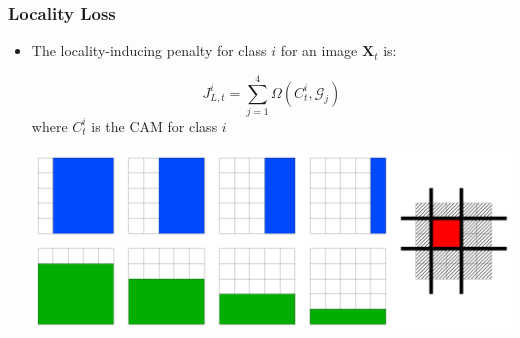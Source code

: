%


\begin{frame}
	\frametitle{Locality Loss}
	\begin{itemize}
		\item The locality-inducing penalty for class $i$ for an image $\mathbf{X}_t$ is:
			\begin{block}{}
				\begin{equation*}
					J_{L,t}^{i} = \sum_{j=1}^{4}\Omega(C^i_t, \mathcal G_j)
				\end{equation*}
				where $C^i_{t}$ is the CAM for class $i$
			\end{block}
			\includegraphics[scale=0.4, center]{images/locality.png}
	\end{itemize}
\end{frame}


